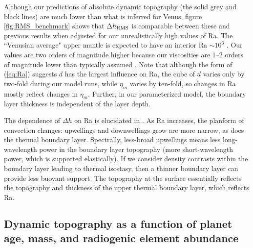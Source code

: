 Although our predictions of absolute dynamic topography (the solid grey and black lines) are much lower than what is inferred for Venus, figure \ref{fig:RMS_benchmark} shows that $\Delta h_{\rm RMS}$ is comparable between these and previous results when adjusted for our unrealistically high values of Ra. The ``Venusian average" upper mantle is expected to have an interior Ra $\sim 10^6$ \citep{Kiefer1998}. Our values are two orders of magnitude higher because our viscosities are 1--2 orders of magnitude lower than typically assumed \citep[cf.][]{Benesova2012}. Note that although the form of (\ref{eq:Ra}) suggests $d$ has the largest influence on Ra, the cube of $d$ varies only by two-fold during our model runs, while $\eta_m$ varies by ten-fold, so changes in Ra mostly reflect changes in $\eta_m$. Further, in our parameterized model, the boundary layer thickness is independent of the layer depth. %





The dependence of $\Delta h$ on Ra is elucidated in \citet{Kiefer1992}. As Ra increases, the planform of convection changes: upwellings and downwellings grow are more narrow, as does the thermal boundary layer. Spectrally, less-broad upwellings means less long-wavelength power in the boundary layer topography (more short-wavelength power, which is supported elastically). If we consider density contrasts within the boundary layer leading to thermal isostasy, then a thinner boundary layer can provide less buoyant support. The topography at the surface essentially reflects the topography and thickness of the upper thermal boundary layer, which reflects Ra. 


\subsection{Dynamic topography as a function of planet age, mass, and radiogenic element abundance}

